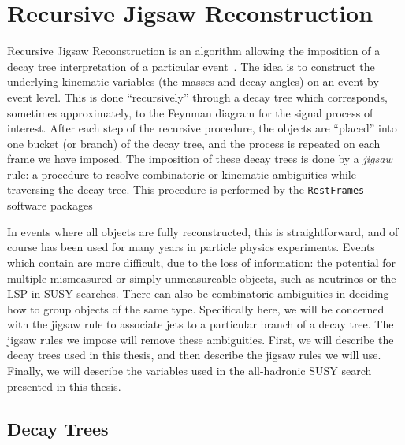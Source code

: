 \section{Recursive Jigsaw Reconstruction}

Recursive Jigsaw Reconstruction is an algorithm allowing the imposition of a decay tree interpretation of a particular event~\cite{Jackson:2016mfb,ATLAS-CONF-2016-078}.
The idea is to construct the underlying kinematic variables (the masses and decay angles) on an event-by-event level.
This is done ``recursively'' through a decay tree which corresponds, sometimes approximately, to the Feynman diagram for the signal process of interest.
After each step of the recursive procedure, the objects are ``placed'' into one bucket (or branch) of the decay tree, and the process is repeated on each frame we have imposed.
The imposition of these decay trees is done by a \textit{jigsaw} rule: a procedure to resolve combinatoric or kinematic ambiguities while traversing the decay tree.
This procedure is performed by the \texttt{RestFrames} software packages ~\cite{RestFrames}

In events where all objects are fully reconstructed, this is straightforward, and of course has been used for many years in particle physics experiments.
Events which contain \met are more difficult, due to the loss of information: the potential for multiple mismeasured or simply unmeasureable objects, such as neutrinos or the LSP in SUSY searches.
There can also be combinatoric ambiguities in deciding how to group objects of the same type.
Specifically here, we will be concerned with the jigsaw rule to associate jets to a particular branch of a decay tree.
The jigsaw rules we impose will remove these ambiguities.
First, we will describe the decay trees used in this thesis, and then describe the jigsaw rules we will use.
Finally, we will describe the variables used in the all-hadronic SUSY search presented in this thesis.

\subsection{Decay Trees}

